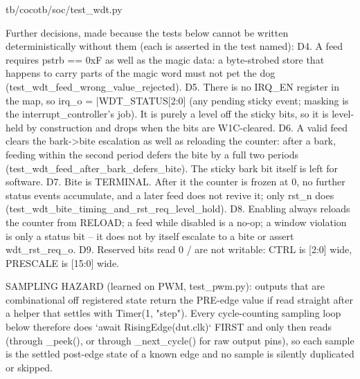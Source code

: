 \begin{relocated}{tb/cocotb/soc/test_wdt.py}
\begin{textblock}
Further decisions, made because the tests below cannot be written deterministically without
them (each is asserted in the test named):
D4. A feed requires pstrb == 0xF as well as the magic data: a byte-strobed store that happens to
carry parts of the magic word must not pet the dog (test_wdt_feed_wrong_value_rejected).
D5. There is no IRQ_EN register in the map, so irq_o = |WDT_STATUS[2:0] (any pending sticky
event; masking is the interrupt_controller's job). It is purely a level off the sticky
bits, so it is level-held by construction and drops when the bits are W1C-cleared.
D6. A valid feed clears the bark->bite escalation as well as reloading the counter: after a
bark, feeding within the second period defers the bite by a full two periods
(test_wdt_feed_after_bark_defers_bite). The sticky bark bit itself is left for software.
D7. Bite is TERMINAL. After it the counter is frozen at 0, no further status events accumulate,
and a later feed does not revive it; only rst_n does (test_wdt_bite_timing_and_rst_req_level_hold).
D8. Enabling always reloads the counter from RELOAD; a feed while disabled is a no-op; a window
violation is only a status bit -- it does not by itself escalate to a bite or assert
wdt_rst_req_o.
D9. Reserved bits read 0 / are not writable: CTRL is [2:0] wide, PRESCALE is [15:0] wide.

SAMPLING HAZARD (learned on PWM, test_pwm.py): outputs that are combinational off registered state
return the PRE-edge value if read straight after a helper that settles with Timer(1, "step").
Every cycle-counting sampling loop below therefore does `await RisingEdge(dut.clk)` FIRST and only
then reads (through _peek(), or through _next_cycle() for raw output pins), so each sample is the
settled post-edge state of a known edge and no sample is silently duplicated or skipped.


\end{textblock}
\end{relocated}
